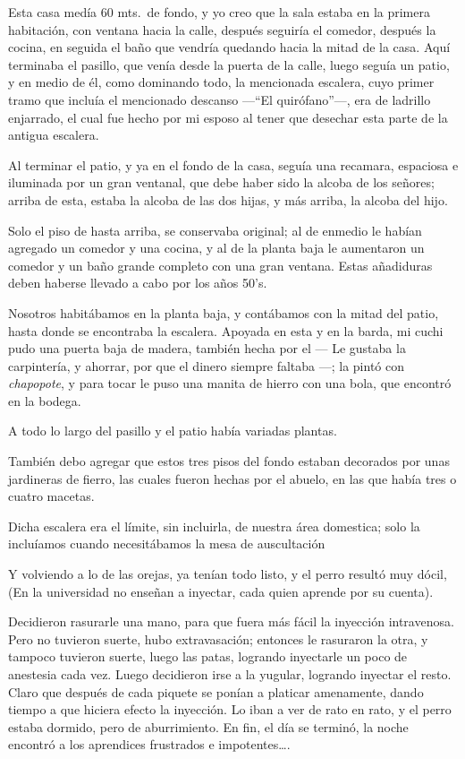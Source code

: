 \documentclass[letterpaper, 12pt]{book}
\begin{document}
Esta casa medía 60 mts.\ de fondo, y yo creo que la sala estaba en la primera habitación, con ventana hacia la calle, después seguiría el comedor, después la cocina, en seguida el baño que vendría quedando hacia la mitad de la casa. Aquí terminaba el pasillo, que venía desde la puerta de la calle, luego seguía un patio, y en medio de él, como dominando todo, la mencionada escalera, cuyo primer tramo que incluía el mencionado descanso ---``El quirófano''---, era de ladrillo enjarrado, el cual fue hecho por mi esposo al tener que desechar esta parte de la antigua escalera.

Al terminar el patio, y ya en el fondo de la casa, seguía una recamara, espaciosa e iluminada por un gran ventanal, que debe haber sido la alcoba de los señores; arriba de esta, estaba la alcoba de las dos hijas, y más arriba, la alcoba del hijo.

Solo el piso de hasta arriba, se conservaba original; al de enmedio le habían agregado un comedor y una cocina, y al de la planta baja le aumentaron un comedor y un baño grande completo con una gran ventana. Estas añadiduras deben haberse llevado a cabo por los años 50's. 

Nosotros habitábamos en la planta baja, y contábamos con la mitad del patio, hasta donde se encontraba la escalera. Apoyada en esta y en la barda, mi cuchi pudo una puerta baja de madera, también hecha por el --- Le gustaba la carpintería, y ahorrar, por que el dinero siempre faltaba ---; la pintó con \textit{chapopote}, y para tocar le puso una manita de hierro con una bola, que encontró en la bodega.

A todo lo largo del pasillo y el patio había variadas plantas. 

También debo agregar que estos tres pisos del fondo estaban decorados por unas jardineras de fierro, las cuales fueron hechas por el abuelo, en las que había tres o cuatro macetas. 

Dicha escalera era el límite, sin incluirla, de nuestra área domestica; solo la incluíamos cuando necesitábamos la mesa de auscultación

Y volviendo a lo de las orejas, ya tenían todo listo, y el perro resultó muy dócil, (En la universidad no enseñan a inyectar, cada quien aprende por su cuenta).

Decidieron rasurarle una mano, para que fuera más fácil la inyección intravenosa. Pero no tuvieron suerte, hubo extravasación; entonces le rasuraron la otra, y tampoco tuvieron suerte, luego las patas, logrando inyectarle un poco de anestesia cada vez. Luego decidieron  irse a la yugular, logrando inyectar el resto. Claro que después de cada piquete se ponían a platicar amenamente, dando tiempo a que hiciera efecto la inyección. Lo iban a ver de rato en rato, y el perro estaba dormido, pero de aburrimiento. En fin, el día se terminó, la noche encontró a los aprendices frustrados e impotentes\ldots.
\end{document}
